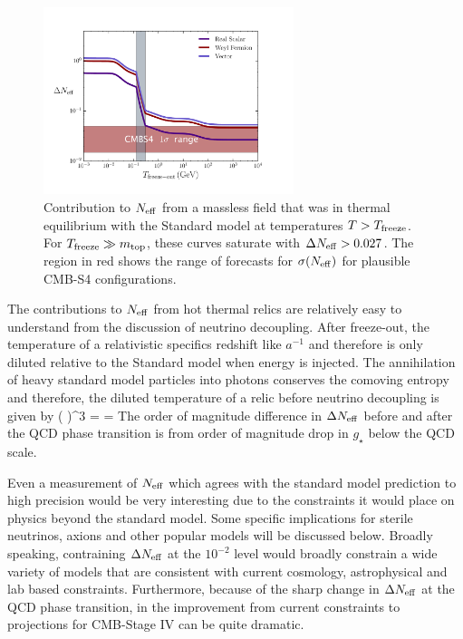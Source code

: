 \begin{figure}[t!]
\begin{center}
\includegraphics[width=0.65\textwidth]{Neutrinos/Neff.pdf}
\caption{Contribution to $N_{\rm eff}$ from a massless field that was in thermal equilibrium with the Standard model at temperatures $T> T_{\rm freeze}$.  For $T_{\rm freeze} \gg m_{\rm top}$, these curves saturate with $\Delta N_{\rm eff} > 0.027$.   The region in red shows the range of forecasts for $\sigma(N_{\rm eff})$ for plausible CMB-S4 configurations. }
\label{fig:limits}
\end{center}
\end{figure} 

The contributions to $N_{\rm eff}$ from hot thermal relics are relatively easy to understand from the discussion of neutrino decoupling.  After freeze-out, the temperature of a relativistic specifics redshift like $a^{-1}$ and therefore is only diluted relative to the Standard model when energy is injected.  The annihilation of heavy standard model particles into photons conserves the comoving entropy and therefore, the diluted temperature of a relic before neutrino decoupling is given by
\beq
\left(  \right)^3 = = 
\eeq
The order of magnitude difference in $\Delta N_{\rm eff}$ before and after the QCD phase transition is from order of magnitude drop in $g_\star$ below the QCD scale.

Even a measurement of $N_{\rm eff}$ which agrees with the standard model prediction to high precision would be very interesting due to the constraints it would place on physics beyond the standard model.  Some specific implications for sterile neutrinos, axions and other popular models will be discussed below.  Broadly speaking, contraining $\Delta N_{\rm eff}$ at the $10^{-2}$ level would broadly constrain a wide variety of models that are consistent with current cosmology, astrophysical and lab based constraints.  Furthermore, because of the sharp change in $\Delta N_{\rm eff}$ at the QCD phase transition, in the improvement from current constraints to projections for CMB-Stage IV can be quite dramatic.

